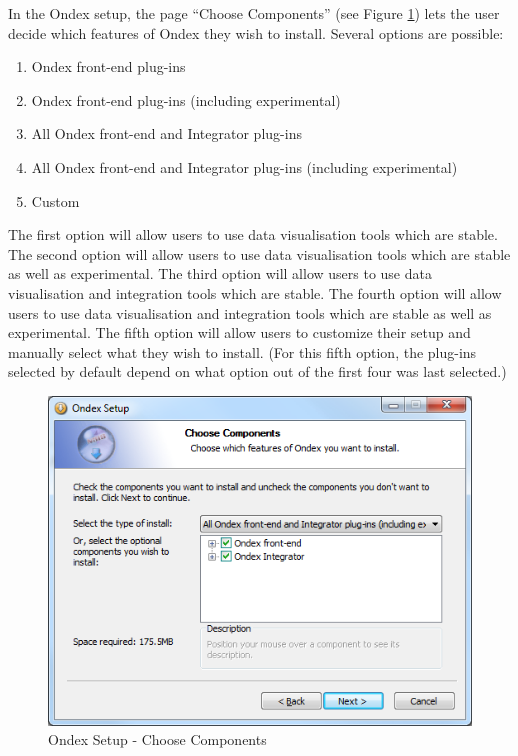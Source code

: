 In the Ondex setup, the page ``Choose Components'' (see Figure \ref{fig:choose_components}) 
lets the user decide which features of Ondex they wish to install.
Several options are possible:
\begin{enumerate}
\item Ondex front-end plug-ins
\item Ondex front-end plug-ins (including experimental)
\item All Ondex front-end and Integrator plug-ins
\item All Ondex front-end and Integrator plug-ins (including experimental)
\item Custom
\end{enumerate}
The first option will allow users to use data visualisation tools which are stable.
The second option will allow users to use data visualisation tools which are stable as well as experimental.
The third option will allow users to use data visualisation and integration tools which are stable.
The fourth option will allow users to use data visualisation and integration tools which are stable as well as experimental.
The fifth option will allow users to customize their setup and manually select what they wish to install.
(For this fifth option, the plug-ins selected by default depend on what option out of the first four was last selected.)

\begin{figure}[H]
\centering
\includegraphics[scale=0.75]{images/Oct12/choose_components.png} 
\caption{Ondex Setup - Choose Components}
\label{fig:choose_components}
\end{figure}

